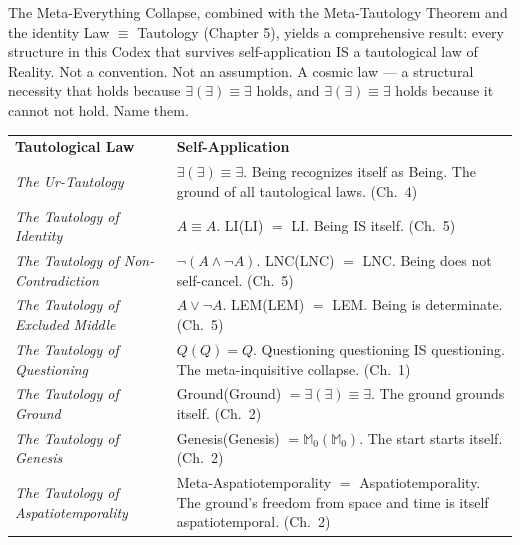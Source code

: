 \documentclass[10pt, openany, oneside]{book}
\renewcommand{\footnotesize}{\fontsize{8.5}{11}\selectfont}
\begin{document}
The Meta-Everything Collapse, combined with the Meta-Tautology Theorem and the identity Law $\equiv$ Tautology (Chapter 5), yields a comprehensive result: every structure in this Codex that survives self-application IS a tautological law of Reality. Not a convention. Not an assumption. A cosmic law --- a structural necessity that holds because $\exists(\exists) \equiv \exists$ holds, and $\exists(\exists) \equiv \exists$ holds because it cannot not hold. Name them.

\vspace{0.5em}

{\footnotesize
\noindent\begin{tabular}{@{} p{} @{\hspace{0.5em}} p{} @{}}
\textbf{Tautological Law} & \textbf{Self-Application} \\[0.5em]

\textit{The Ur-Tautology} & $\exists(\exists) \equiv \exists$. Being recognizes itself as Being. The ground of all tautological laws. (Ch.\ 4) \\[0.3em]

\textit{The Tautology of Identity} & $A \equiv A$. LI(LI) $=$ LI. Being IS itself. (Ch.\ 5) \\[0.3em]

\textit{The Tautology of Non-Contradiction} & $\neg(A \wedge \neg A)$. LNC(LNC) $=$ LNC. Being does not self-cancel. (Ch.\ 5) \\[0.3em]

\textit{The Tautology of Excluded Middle} & $A \vee \neg A$. LEM(LEM) $=$ LEM. Being is determinate. (Ch.\ 5) \\[0.3em]

\textit{The Tautology of Questioning} & $Q(Q) = Q$. Questioning questioning IS questioning. The meta-inquisitive collapse. (Ch.\ 1) \\[0.3em]

\textit{The Tautology of Ground} & Ground(Ground) $= \exists(\exists) \equiv \exists$. The ground grounds itself. (Ch.\ 2) \\[0.3em]

\textit{The Tautology of Genesis} & Genesis(Genesis) $= \mathbb{M}_0(\mathbb{M}_0)$. The start starts itself. (Ch.\ 2) \\[0.3em]

\textit{The Tautology of Aspatiotemporality} & Meta-Aspatiotemporality $=$ Aspatiotemporality. The ground's freedom from space and time is itself aspatiotemporal. (Ch.\ 2) \\[0.3em]


\end{tabular}}
\end{document}
